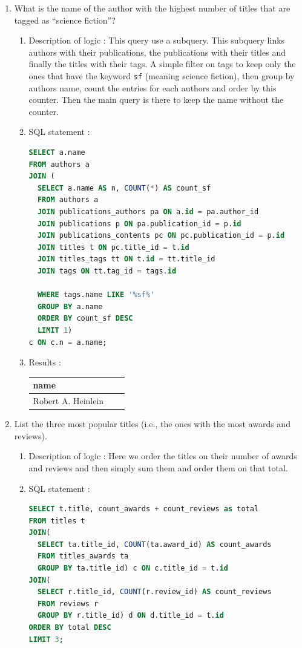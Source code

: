 \documentclass[doubleside, titlepage]{article}
\begin{document}
\begin{enumerate}
\begin{enumerate}
\end{enumerate}

\item What is the name of the author with the highest number of titles that are tagged as “science fiction”?

	\begin{enumerate}
	\item Description of logic : This query use a subquery. This subquery links authors with their publications, the publications with their titles and finally the titles with their tags. A simple filter on tags to keep only the ones that have the keyword \texttt{sf} (meaning science fiction), then group by authors name, count the entries for each authors and order by this counter. Then the main query is there to keep the name without the counter.
	\item SQL statement :
		\begin{lstlisting}[language=SQL,showspaces=false,basicstyle=\ttfamily,numberstyle=\tiny,commentstyle=\color{gray}]
SELECT a.name
FROM authors a
JOIN (
  SELECT a.name AS n, COUNT(*) AS count_sf
  FROM authors a
  JOIN publications_authors pa ON a.id = pa.author_id
  JOIN publications p ON pa.publication_id = p.id
  JOIN publications_contents pc ON pc.publication_id = p.id
  JOIN titles t ON pc.title_id = t.id
  JOIN titles_tags tt ON t.id = tt.title_id
  JOIN tags ON tt.tag_id = tags.id

  WHERE tags.name LIKE '%sf%'
  GROUP BY a.name
  ORDER BY count_sf DESC
  LIMIT 1)
c ON c.n = a.name;
		\end{lstlisting}

	\item Results :\\

	\begin{tabular}{|l|c|r|}
	  \hline
		name\\
	  \hline
		Robert A. Heinlein\\
	  \hline
	\end{tabular}
\end{enumerate}

\item List the three most popular titles (i.e., the ones with the most awards and reviews).

	\begin{enumerate}
	\item Description of logic : Here we order the titles on their number of awards and reviews and then simply sum them and order them on that total.
	\item SQL statement :
		\begin{lstlisting}[language=SQL,showspaces=false,basicstyle=\ttfamily,numberstyle=\tiny,commentstyle=\color{gray}]
SELECT t.title, count_awards + count_reviews as total
FROM titles t
JOIN(
  SELECT ta.title_id, COUNT(ta.award_id) AS count_awards
  FROM titles_awards ta
  GROUP BY ta.title_id) c ON c.title_id = t.id
JOIN(
  SELECT r.title_id, COUNT(r.review_id) AS count_reviews
  FROM reviews r
  GROUP BY r.title_id) d ON d.title_id = t.id
ORDER BY total DESC
LIMIT 3;
		\end{lstlisting}


\end{enumerate}
\end{enumerate}
\end{document}
